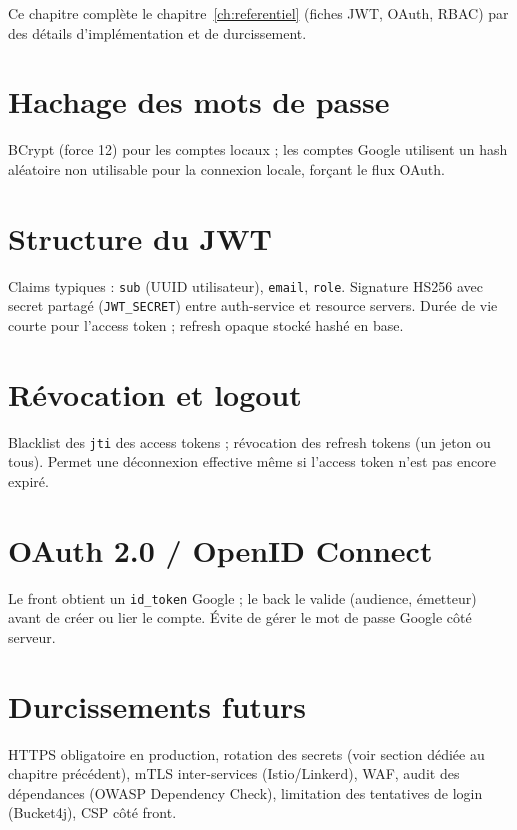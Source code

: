 \documentclass[12pt,a4paper]{report}
\begin{document}
Ce chapitre complète le chapitre~\ref{ch:referentiel} (fiches JWT, OAuth, RBAC) par des détails d'implémentation et de durcissement.

\section{Hachage des mots de passe}
BCrypt (force 12) pour les comptes locaux ; les comptes Google utilisent un hash aléatoire non utilisable pour la connexion locale, forçant le flux OAuth.\par

\section{Structure du JWT}
Claims typiques : \texttt{sub} (UUID utilisateur), \texttt{email}, \texttt{role}. Signature HS256 avec secret partagé (\texttt{JWT\_SECRET}) entre auth-service et resource servers. Durée de vie courte pour l'access token ; refresh opaque stocké hashé en base.\par

\section{Révocation et logout}
Blacklist des \texttt{jti} des access tokens ; révocation des refresh tokens (un jeton ou tous). Permet une déconnexion effective même si l'access token n'est pas encore expiré.\par

\section{OAuth 2.0 / OpenID Connect}
Le front obtient un \texttt{id\_token} Google ; le back le valide (audience, émetteur) avant de créer ou lier le compte. Évite de gérer le mot de passe Google côté serveur.\par

\section{Durcissements futurs}
HTTPS obligatoire en production, rotation des secrets (voir section dédiée au chapitre précédent), mTLS inter-services (Istio/Linkerd), WAF, audit des dépendances (OWASP Dependency Check), limitation des tentatives de login (Bucket4j), CSP côté front.\par

\end{document}
